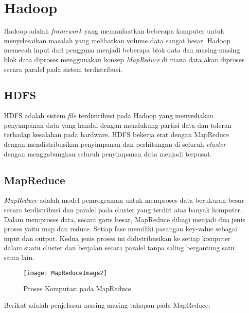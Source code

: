 \section{Hadoop}
Hadoop adalah \textit{framework} yang memanfaatkan beberapa komputer untuk menyelesaikan masalah yang melibatkan volume data sangat besar. Hadoop memecah input dari pengguna menjadi beberapa blok data dan masing-masing blok data diproses menggunakan konsep \textit{MapReduce} di mana data akan diproses secara paralel pada sistem terdistribusi. 

\subsection{HDFS}
HDFS adalah sistem \textit{file} terdistribusi pada Hadoop yang menyediakan penyimpanan data yang handal dengan mendukung partisi data dan toleran terhadap kesalahan pada hardware. HDFS bekerja erat dengan MapReduce dengan mendistribusikan penyimpanan dan perhitungan di seluruh \textit{cluster} dengan menggabungkan seluruh penyimpanan data menjadi terpusat.

\subsection{MapReduce}
\textit{MapReduce} adalah model pemrograman untuk memproses data berukuran besar secara terdistribusi dan paralel pada cluster yang terdiri atas banyak komputer. Dalam memproses data, secara garis besar, MapReduce dibagi menjadi dua jenis proses yaitu map dan reduce. Setiap fase memiliki pasangan key-value sebagai input dan output. Kedua jenis proses ini didistribusikan ke setiap komputer dalam suatu cluster dan berjalan secara paralel tanpa saling bergantung satu sama lain.

\begin{figure}[H]
	\centering
	\texttt{[image: MapReduceImage2]}
	\caption{Proses Komputasi pada MapReduce}
	\label{fig:MapReduceImage}
\end{figure}

\noindent Berikut adalah penjelasan masing-masing tahapan pada MapReduce:


